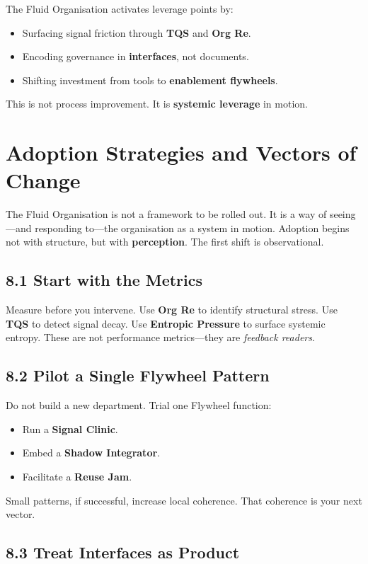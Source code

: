 \documentclass[12pt]{article}
\begin{document}
The Fluid Organisation activates leverage points by:
\begin{itemize}
    \item Surfacing signal friction through \textbf{TQS} and \textbf{Org Re}.
    \item Encoding governance in \textbf{interfaces}, not documents.
    \item Shifting investment from tools to \textbf{enablement flywheels}.
\end{itemize}

This is not process improvement. It is \textbf{systemic leverage} in motion.

\section{Adoption Strategies and Vectors of Change}

The Fluid Organisation is not a framework to be rolled out. It is a way of seeing—and responding to—the organisation as a system in motion. Adoption begins not with structure, but with \textbf{perception}. The first shift is observational.

\subsection*{8.1 Start with the Metrics}

Measure before you intervene. Use \textbf{Org Re} to identify structural stress. Use \textbf{TQS} to detect signal decay. Use \textbf{Entropic Pressure} to surface systemic entropy. These are not performance metrics—they are \textit{feedback readers}.

\subsection*{8.2 Pilot a Single Flywheel Pattern}

Do not build a new department. Trial one Flywheel function:
\begin{itemize}
    \item Run a \textbf{Signal Clinic}.
    \item Embed a \textbf{Shadow Integrator}.
    \item Facilitate a \textbf{Reuse Jam}.
\end{itemize}

Small patterns, if successful, increase local coherence. That coherence is your next vector.

\subsection*{8.3 Treat Interfaces as Product}
\end{document}
